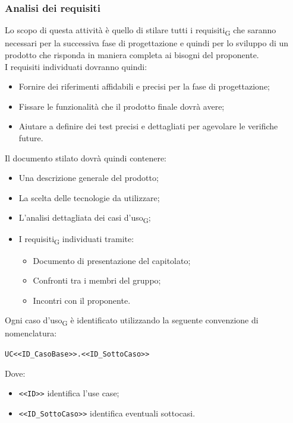     \subsubsection{Analisi dei requisiti}
    Lo scopo di questa attività è quello di stilare tutti i requisiti\textsubscript{G} che saranno necessari per la successiva fase di progettazione e quindi per lo sviluppo di un prodotto che risponda in maniera completa ai bisogni del proponente. \\
    I requisiti individuati dovranno quindi:
    \begin{itemize}
    	\item Fornire dei riferimenti affidabili e precisi per la fase di progettazione;
    	\item Fissare le funzionalità che il prodotto finale dovrà avere;
    	\item Aiutare a definire dei test precisi e dettagliati per agevolare le verifiche future.
    \end{itemize}
    Il documento stilato dovrà quindi contenere:
    \begin{itemize}
    	\item Una descrizione generale del prodotto;
    	\item La scelta delle tecnologie da utilizzare;
    	\item L'analisi dettagliata dei casi d'uso\textsubscript{G};
    	\item I requisiti\textsubscript{G} individuati tramite:
        \begin{itemize}
            \item Documento di presentazione del capitolato;
            \item Confronti tra i membri del gruppo;
            \item Incontri con il proponente.
        \end{itemize}
    \end{itemize} 
    Ogni caso d'uso\textsubscript{G} è identificato utilizzando la seguente convenzione di nomenclatura:
    \begin{center}
		\verb|UC<<ID_CasoBase>>.<<ID_SottoCaso>>|
    \end{center}
    Dove:
    \begin{itemize}
    	\item \verb|<<ID>>| identifica l'use case;
    	\item \verb|<<ID_SottoCaso>>| identifica eventuali sottocasi.
    \end{itemize}

